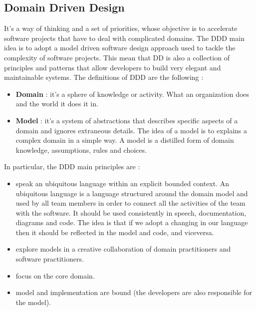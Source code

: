 \documentclass[11pt]{article}
\begin{document}
\begin{appendix}
\section{Domain Driven Design}
It's a way of thinking and a set of priorities, whose objective is to accelerate software projects that have to deal with complicated domains. The DDD main idea is to adopt a model driven software design approach used to tackle the complexity of software projects. This mean that DD is also a collection of principles and patterns that allow developers to build very elegant and maintainable systems. The definitions of DDD are the following :
\begin{itemize}
\item \textbf{Domain} : it's a sphere of knowledge or activity. What an organization does and the world it does it in.
\item \textbf{Model} : it's a system of abstractions that describes specific aspects of a domain and ignores extraneous details. The idea of a model is to explains a complex domain in a simple way. A model is a distilled form of domain knowledge, assumptions, rules and choices.
\end{itemize}
In particular, the DDD main principles are :
\begin{itemize}
\item speak an ubiquitous language within an explicit bounded context. An ubiquitous language is a language structured around the domain model and used by all team members in order to connect all the activities of the team with the software. It should be used consistently in speech, documentation, diagrams and code. The idea is that if we adopt a changing in our language then it should be reflected in the model and code, and viceversa.
\item explore models in a creative collaboration of domain practitioners and software practitioners.
\item focus on the core domain.
\item model and implementation are bound (the developers are also responsible for the model).
\end{itemize}

\end{appendix}
\end{document}
